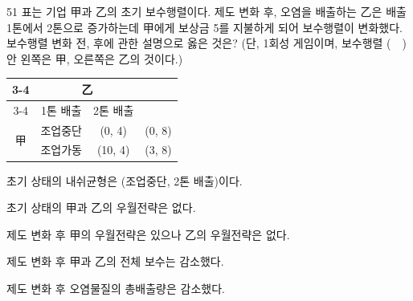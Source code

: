 \begin{question}{51}
표는 기업 甲과 乙의 초기 보수행렬이다. 제도 변화 후, 오염을 배출하는 乙은 배출 1톤에서 2톤으로 증가하는데 甲에게 보상금 5를 지불하게 되어 보수행렬이 변화했다. 보수행렬 변화 전, 후에 관한 설명으로 옳은 것은? (단, 1회성 게임이며, 보수행렬 (\ \ ) 안 왼쪽은 甲, 오른쪽은 乙의 것이다.)
\par{\small\centering
\begin{tabular}{|c|c|c|c|}
\cline{3-4}
\multicolumn{2}{c|}{} & \multicolumn{2}{c|}{乙} \\ \cline{3-4}
\multicolumn{2}{c|}{} & 1톤 배출 & 2톤 배출 \\ \hline
\multirow{2}{*}{甲} & 조업중단 & (0, 4) & (0, 8) \\ \cline{2-4}
 & 조업가동 & (10, 4) & (3, 8) \\ \hline
\end{tabular}\par}
\begin{choices}
  \item 초기 상태의 내쉬균형은 (조업중단, 2톤 배출)이다.
  \item 초기 상태의 甲과 乙의 우월전략은 없다.
  \item 제도 변화 후 甲의 우월전략은 있으나 乙의 우월전략은 없다.
  \item 제도 변화 후 甲과 乙의 전체 보수는 감소했다.
  \item 제도 변화 후 오염물질의 총배출량은 감소했다.
\end{choices}
\end{question}
